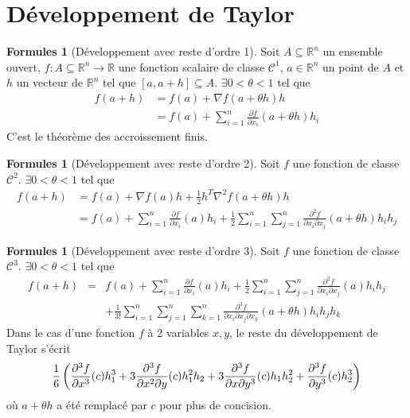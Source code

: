 \documentclass[11pt,a4paper]{article}
\theoremstyle{definition}
\newtheorem{myform}[mydef]{Formules}
\newcommand{\pa}{\partial}
\newcommand{\R}{\mathbb{R}}
\begin{document}

\section{Développement de Taylor}

\begin{myform}[Développement avec reste d'ordre 1]
	Soit $A \subseteq \R^n$ un ensemble ouvert, $f : A \subseteq \R^n \to \R$ une fonction scalaire de classe $\mathcal{C}^1$, $a \in \R^n$ un point de $A$ et $h$ un vecteur de $\R^n$ tel que $[a, a+h] \subseteq A$. $\exists 0 < \theta < 1$ tel que
	\begin{align*}
		f(a+h) & = f(a) + \nabla f(a+\theta h)h \\
		& = f(a) + \sum_{i =1}^n \frac{\pa f}{\pa x_i} (a+\theta h)h_i
	\end{align*}
	C'est le théorème des accroissement finis.
\end{myform}

\begin{myform}[Développement avec reste d'ordre 2]
	Soit $f$ une fonction de classe $\mathcal{C}^2$.
	$\exists 0 < \theta < 1$ tel que
	\begin{align*} f(a+h) & = f(a) + \nabla f(a) h + \frac12 h^T \nabla^2 f(a+\theta h) h \\
		& = f(a) + \sum_{i=1}^n \frac{\pa f}{\pa x_i}(a)h_i + \frac12 \sum_{i=1}^n \sum_{j=1}^n \frac{\pa^2 f}{\pa x_i \pa x_j} (a+ \theta h) h_i h_j
	\end{align*}
\end{myform}

\begin{myform}[Développement avec reste d'ordre 3]
	Soit $f$ une fonction de classe $\mathcal{C}^3$.
	$\exists 0 < \theta < 1$ tel que
	\begin{eqnarray*}
		f(a+h) &=& f(a) + \sum_{i=1}^n \frac{\pa f}{\pa x_i}(a)h_i
		+ \frac 12 \sum_{i=1}^n \sum_{j=1}^n \frac{\pa^2 f}{\pa x_i \pa x_j} (a) h_i h_j \\
		&& + \frac{1}{3!} \sum_{i=1}^n \sum_{j=1}^n \sum_{k=1}^n \frac{\pa^3 f}{\pa x_i \pa x_j \pa x_k}(a+\theta h)h_i h_j h_k
	\end{eqnarray*}
	Dans le cas d'une fonction $f$ à 2 variables $x, y$, le reste du développement de Taylor s'écrit
	\[
	\frac{1}{6}
	\left(
	\frac{\pa^3 f}{\pa x^3}(c)h_1^3
	+ 3\frac{\pa^3 f}{\pa x^2\pa y}(c)h_1^2h_2\\
	+ 3\frac{\pa^3 f}{\pa x\pa y^3}(c)h_1h_2^2
	+ \frac{\pa^3 f}{\pa y^3}(c)h_2^3
	\right)
	\]
	où $a + \theta h$ a été remplacé par $c$ pour plus de concision.
\end{myform}
\end{document}

